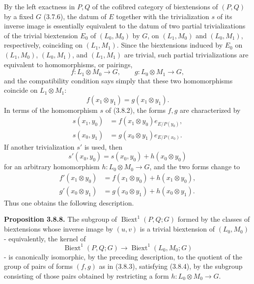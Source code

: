 \documentclass[11pt]{article}
\providecommand{\Biext}{\operatorname{Biext}}
\begin{document}
By the left exactness in \(P,Q\) of the cofibred category of biextensions of \((P,Q)\) by a fixed \(G\) (3.7.6), the datum of \(E\) together with the trivialization \(s\) of its inverse image is essentially equivalent to the datum of two partial trivializations of the trivial biextension \(E_0\) of \((L_0,M_0)\) by \(G\), on \((L_1,M_0)\) and \((L_0,M_1)\), respectively, coinciding on \((L_1,M_1)\).  Since the biextensions induced by \(E_0\) on \((L_1,M_0)\), \((L_0,M_1)\), and \((L_1,M_1)\) are trivial, such partial trivializations are equivalent to homomorphisms, or pairings,
\begin{equation}\tag{3.8.3}
        f:L_1\otimes M_0\longrightarrow G,
        \qquad
        g:L_0\otimes M_1\longrightarrow G,
\end{equation}
and the compatibility condition says simply that these two homomorphisms coincide on \(L_1\otimes M_1\):
\begin{equation}\tag{3.8.4}
        f(x_1\otimes y_1)=g(x_1\otimes y_1).
\end{equation}
In terms of the homomorphism \(s\) of (3.8.2), the forms \(f,g\) are characterized by
\begin{equation}\tag{3.8.5}
\begin{aligned}
 s(x_1,y_0)&=f(x_1\otimes y_0)e_{E/P(y_0)},\\
 s(x_0,y_1)&=g(x_0\otimes y_1)e_{E/P(x_0)}.
\end{aligned}
\end{equation}
If another trivialization \(s'\) is used, then
\begin{equation}\tag{3.8.6}
        s'(x_0,y_0)=s(x_0,y_0)+h(x_0\otimes y_0)
\end{equation}
for an arbitrary homomorphism \(h:L_0\otimes M_0\to G\), and the two forms change to
\begin{equation}\tag{3.8.7}
\begin{aligned}
 f'(x_1\otimes y_0)&=f(x_1\otimes y_0)+h(x_1\otimes y_0),\\
 g'(x_0\otimes y_1)&=g(x_0\otimes y_1)+h(x_0\otimes y_1).
\end{aligned}
\end{equation}
Thus one obtains the following description.

\textbf{Proposition 3.8.8.}  The subgroup of \(\Biext^1(P,Q;G)\) formed by the classes of biextensions whose inverse image by \((u,v)\) is a trivial biextension of \((L_0,M_0)\) - equivalently, the kernel of
\[
        \Biext^1(P,Q;G)\longrightarrow \Biext^1(L_0,M_0;G)
\]
- is canonically isomorphic, by the preceding description, to the quotient of the group of pairs of forms \((f,g)\) as in (3.8.3), satisfying (3.8.4), by the subgroup consisting of those pairs obtained by restricting a form \(h:L_0\otimes M_0\to G\).
\end{document}
